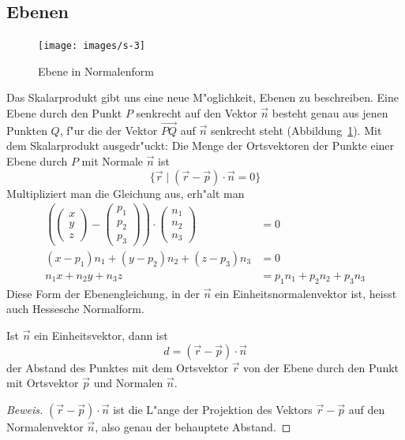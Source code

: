 \subsection{Ebenen}
\begin{figure}
\begin{center}
\texttt{[image: images/s-3]}
\end{center}
\caption{Ebene in Normalenform\label{image-normalenform}}
\end{figure}
Das Skalarprodukt gibt uns eine neue M"oglichkeit, Ebenen zu
beschreiben.
Eine Ebene durch den Punkt $P$ senkrecht auf den Vektor
$\vec n$ besteht genau aus jenen Punkten $Q$, f"ur die der Vektor
$\overset{\rightarrow}{PQ}$ auf $\vec n$ senkrecht steht
(Abbildung~\ref{image-normalenform}). Mit dem Skalarprodukt
ausgedr"uckt: Die Menge der Ortsvektoren der Punkte einer Ebene durch $P$ mit
Normale $\vec n$ ist
\[
\{\vec r\;|\;(\vec r-\vec p)\cdot \vec n=0\}
\]
Multipliziert man die Gleichung aus, erh"alt man
\begin{align*}
\left(
\begin{pmatrix}x\\y\\z\end{pmatrix}
-\begin{pmatrix}p_1\\p_2\\p_3\end{pmatrix}\right)\cdot
\begin{pmatrix}n_1\\n_2\\n_3\end{pmatrix}&=0
\\
(x-p_1)n_1+(y-p_2)n_2+(z-p_3)n_3&=0
\\
n_1x+n_2y+n_3z&=p_1n_1+p_2n_2+p_3n_3
\end{align*}
Diese Form der Ebenengleichung, in der $\vec n$ ein Einheitsnormalenvektor ist,
heisst auch Hessesche Normalform.

\begin{satz}
Ist $\vec n$ ein Einheitsvektor, dann ist
\[
d=(\vec r-\vec p)\cdot \vec n
\]
der Abstand des Punktes mit dem Ortsvektor $\vec r$ von der Ebene durch
den Punkt mit Ortsvektor $\vec p$ und Normalen $\vec n$.
\end{satz}
\begin{proof}[Beweis]
$(\vec r-\vec p)\cdot \vec n$ ist die L"ange der Projektion des Vektors
$\vec r -\vec p$ auf den Normalenvektor $\vec n$, also genau der behauptete
Abstand.
\end{proof}

